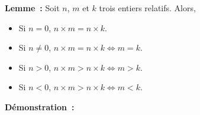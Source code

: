    \done 

\medskip

\noindent\textbf{Lemme :} Soit $n$, $m$ et $k$ trois entiers relatifs. 
    Alors, 
    \begin{itemize}[nosep]
        \item Si $n = 0$, $n \times m = n \times k$.
        \item Si $n \neq 0$, $n \times m = n \times k \Leftrightarrow m = k$.
        \item Si $n > 0$, $n \times m > n \times k \Leftrightarrow m > k$.
        \item Si $n < 0$, $n \times m > n \times k \Leftrightarrow m < k$.
    \end{itemize}

\medskip

\noindent\textbf{Démonstration :} 
